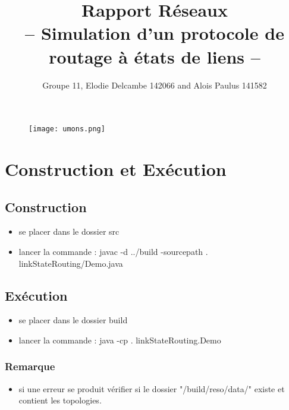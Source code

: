 \documentclass[a4paper, 12pt]{article}
\title{Rapport Réseaux \\ -- Simulation d'un protocole de routage à états de liens --}
\author{Groupe 11, Elodie Delcambe 142066 and Alois Paulus 141582 }
\begin{document}
\maketitle

\begin{figure}
\centering
\texttt{[image: umons.png]}
\end{figure}

\newpage
\tableofcontents
\newpage

\section{Construction et Exécution}
\subsection{Construction}
\begin{itemize}
\item se placer dans le dossier src
\item lancer la commande : javac -d ../build -sourcepath . linkStateRouting/Demo.java
\end{itemize}

\subsection{Exécution}

\begin{itemize}
\item se placer dans le dossier build
\item lancer la commande : java -cp . linkStateRouting.Demo
\end{itemize}

\subsubsection{Remarque}
\begin{itemize}
\item si une erreur se produit vérifier si le dossier "/build/reso/data/" existe et contient les topologies.
\end{itemize}
\end{document}
